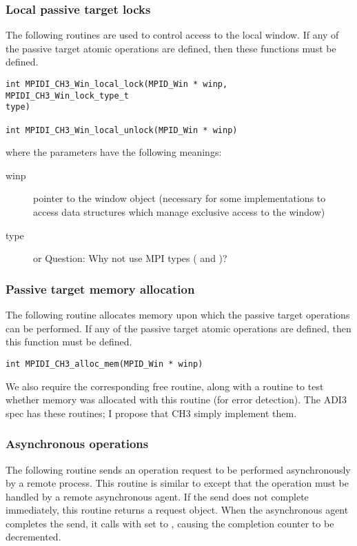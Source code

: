 \documentclass{article}
\begin{document}
\subsubsection{Local passive target locks}

The following routines are used to control access to the local window.  If
any of the passive target atomic operations are defined, then these
functions must be defined.

\begin{verbatim}
int MPIDI_CH3_Win_local_lock(MPID_Win * winp, MPIDI_CH3_Win_lock_type_t
type)

int MPIDI_CH3_Win_local_unlock(MPID_Win * winp)
\end{verbatim}
where the parameters have the following meanings:
\begin{description}
\item[winp]pointer to the window object (necessary for some implementations to
access data structures which manage exclusive access to the window)

\item[type] or
Question: Why not use MPI types ( and
)? 
\end{description}

\subsubsection{Passive target memory allocation}

The following routine allocates memory upon which the passive target
operations can be performed.  If any of the passive target atomic operations
are defined, then this function must be defined.

\begin{verbatim}
int MPIDI_CH3_alloc_mem(MPID_Win * winp)
\end{verbatim}

We also require the corresponding free routine, along with a routine to test
whether memory was allocated with this routine (for error detection).  The
ADI3 spec has these routines; I propose that CH3 simply implement them.

\subsubsection{Asynchronous operations}

The following routine sends an operation request to be performed
asynchronously by a remote process.  This routine is similar to
 except that the operation must be
handled by a remote 
asynchronous agent.  If the send does not complete immediately, this routine
returns a request object.  When the asynchronous agent completes the send,
it calls  with  set to
, causing the completion counter
 to be decremented.
\end{document}
